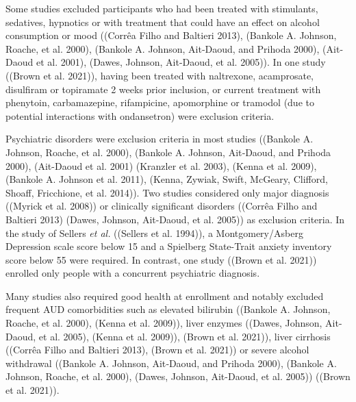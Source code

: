 \documentclass[
  12pt,
]{article}
\begin{document}
Some studies excluded participants who had been treated with stimulants,
sedatives, hypnotics or with treatment that could have an effect on
alcohol consumption or mood ((Corrêa Filho and Baltieri 2013), (Bankole
A. Johnson, Roache, et al. 2000), (Bankole A. Johnson, Ait‐Daoud, and
Prihoda 2000), (Ait-Daoud et al. 2001), (Dawes, Johnson, Ait-Daoud, et
al. 2005)). In one study ((Brown et al. 2021)), having been treated with
naltrexone, acamprosate, disulfiram or topiramate 2 weeks prior
inclusion, or current treatment with phenytoin, carbamazepine,
rifampicine, apomorphine or tramodol (due to potential interactions with
ondansetron) were exclusion criteria.

Psychiatric disorders were exclusion criteria in most studies ((Bankole
A. Johnson, Roache, et al. 2000), (Bankole A. Johnson, Ait‐Daoud, and
Prihoda 2000), (Ait-Daoud et al. 2001) (Kranzler et al. 2003), (Kenna et
al. 2009), (Bankole A. Johnson et al. 2011), (Kenna, Zywiak, Swift,
McGeary, Clifford, Shoaff, Fricchione, et al. 2014)). Two studies
considered only major diagnosis ((Myrick et al. 2008)) or clinically
significant disorders ((Corrêa Filho and Baltieri 2013) (Dawes, Johnson,
Ait-Daoud, et al. 2005)) as exclusion criteria. In the study of Sellers
\emph{et al.} ((Sellers et al. 1994)), a Montgomery/Asberg Depression
scale score below 15 and a Spielberg State-Trait anxiety inventory score
below 55 were required. In contrast, one study ((Brown et al. 2021))
enrolled only people with a concurrent psychiatric diagnosis.

Many studies also required good health at enrollment and notably
excluded frequent AUD comorbidities such as elevated bilirubin ((Bankole
A. Johnson, Roache, et al. 2000), (Kenna et al. 2009)), liver enzymes
((Dawes, Johnson, Ait-Daoud, et al. 2005), (Kenna et al. 2009)), (Brown
et al. 2021)), liver cirrhosis ((Corrêa Filho and Baltieri 2013), (Brown
et al. 2021)) or severe alcohol withdrawal ((Bankole A. Johnson,
Ait‐Daoud, and Prihoda 2000), (Bankole A. Johnson, Roache, et al. 2000),
(Dawes, Johnson, Ait-Daoud, et al. 2005)) ((Brown et al. 2021)).
\end{document}
